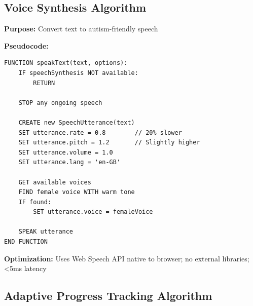 \documentclass[12pt, a4paper]{article}
\begin{document}
\subsection{Voice Synthesis Algorithm}

\begin{tcolorbox}[colback=electricblue!5, colframe=electricblue, title=\textbf{Text-to-Speech Algorithm}]

\textbf{Purpose:} Convert text to autism-friendly speech

\textbf{Pseudocode:}
\begin{verbatim}
FUNCTION speakText(text, options):
    IF speechSynthesis NOT available:
        RETURN
    
    STOP any ongoing speech
    
    CREATE new SpeechUtterance(text)
    SET utterance.rate = 0.8        // 20% slower
    SET utterance.pitch = 1.2       // Slightly higher
    SET utterance.volume = 1.0
    SET utterance.lang = 'en-GB'
    
    GET available voices
    FIND female voice WITH warm tone
    IF found:
        SET utterance.voice = femaleVoice
    
    SPEAK utterance
END FUNCTION
\end{verbatim}

\textbf{Optimization:} Uses Web Speech API native to browser; no external libraries; <5ms latency

\end{tcolorbox}

\subsection{Adaptive Progress Tracking Algorithm}
\end{document}
